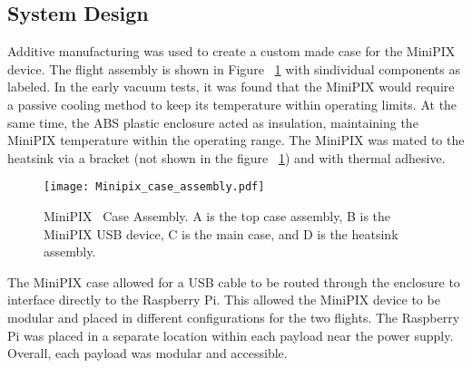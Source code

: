 \subsection{System Design}
Additive manufacturing was used to create a custom made case for the MiniPIX device.  The flight assembly is shown in Figure ~\ref{fig:minipix_case} with sindividual components as labeled.  In the early vacuum tests, it was found that the MiniPIX would require a passive cooling method to keep its temperature within operating limits.  At the same time, the ABS plastic enclosure acted as insulation, maintaining the MiniPIX temperature within the operating range.  The MiniPIX was mated to the heatsink via a bracket (not shown in the figure ~\ref{fig:minipix_case}) and with thermal adhesive.
\begin{figure}[H]
    \centering
    \texttt{[image: Minipix\_case\_assembly.pdf]} %
    \caption{MiniPIX~\cite{advacam} Case Assembly. A is the top case assembly, B is the MiniPIX USB device, C is the main case, and D is the heatsink assembly.}
    \label{fig:minipix_case}
\end{figure}
The MiniPIX case allowed for a USB cable to be routed through the enclosure to interface directly to the Raspberry Pi.  This allowed the MiniPIX device to be modular and placed in different configurations for the two flights.  The Raspberry Pi was placed in a separate location within each payload near the power supply.  Overall, each payload was modular and accessible.




